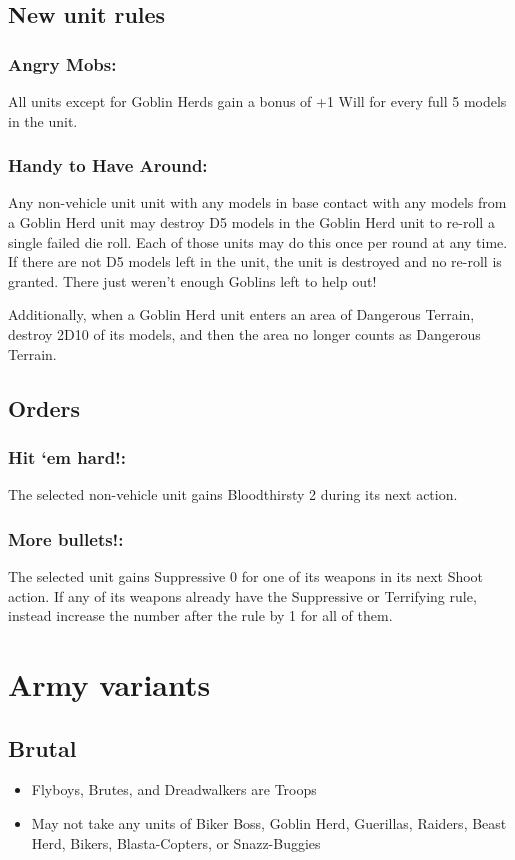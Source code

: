 \subsection*{New unit rules}

\subsubsection*{Angry Mobs:} All units except for Goblin Herds gain a bonus of +1 Will for every full 5 models in the unit.

\subsubsection*{Handy to Have Around:} Any non-vehicle unit unit with any models in base contact with any models from a Goblin Herd unit may destroy D5 models in the Goblin Herd unit to re-roll a single failed die roll. Each of those units may do this once per round at any time. If there are not D5 models left in the unit, the unit is destroyed and no re-roll is granted. There just weren't enough Goblins left to help out!

Additionally, when a Goblin Herd unit enters an area of Dangerous Terrain, destroy 2D10 of its models, and then the area no longer counts as Dangerous Terrain.

\subsection*{Orders}
\subsubsection*{Hit ‘em hard!:} The selected non-vehicle unit gains Bloodthirsty 2 during its next action.

\subsubsection*{More bullets!:} The selected unit gains Suppressive 0 for one of its weapons in its next Shoot action. If any of its weapons already have the Suppressive or Terrifying rule, instead increase the number after the rule by 1 for all of them.


\section*{Army variants}
\subsection*{Brutal}
\begin{itemize}
    \item Flyboys, Brutes, and Dreadwalkers are Troops
    \item May not take any units of Biker Boss, Goblin Herd, Guerillas, Raiders, Beast Herd, Bikers, Blasta-Copters, or Snazz-Buggies
\end{itemize}

